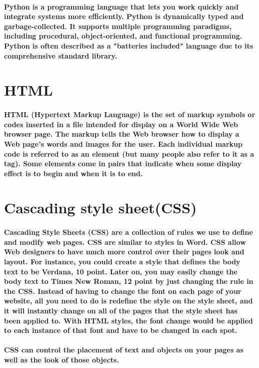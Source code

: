 \documentclass[12pt]{report}
\begin{document}
        \paragraph
        {
        Python is a programming language that lets you work quickly and integrate systems more efficiently. Python is dynamically typed and garbage-collected. It supports multiple programming paradigms, including procedural, object-oriented, and functional programming. Python is often described as a "batteries included" language due to its comprehensive standard library.
        }
        \section{HTML}
        \paragraph
        {
        HTML (Hypertext Markup Language) is the set of markup symbols or codes inserted in a file intended for display on a World Wide Web browser page. The markup tells the Web browser how to display a Web page's words and images for the user. Each individual markup code is referred to as an element (but many people also refer to it as a tag). Some elements come in pairs that indicate when some display effect is to begin and when it is to end.
        }
        \section{Cascading style sheet(CSS)}
        \paragraph
        {
        Cascading Style Sheets (CSS) are a collection of rules we use to define and modify web pages.  CSS are similar to styles in Word.  CSS allow Web designers to have much more control over their pages look and layout.  For instance, you could create a style that defines the body text to be Verdana, 10 point. Later on, you may easily change the body text to Times New Roman, 12 point by just changing the rule in the CSS.  Instead of having to change the font on each page of your website, all you need to do is redefine the style on the style sheet, and it will instantly change on all of the pages that the style sheet has been applied to. With HTML styles, the font change would be applied to each instance of that font and have to be changed in each spot.  
        }
        \paragraph
        {
        CSS can control the placement of text and objects on your pages as well as the look of those objects.
        }
\end{document}
